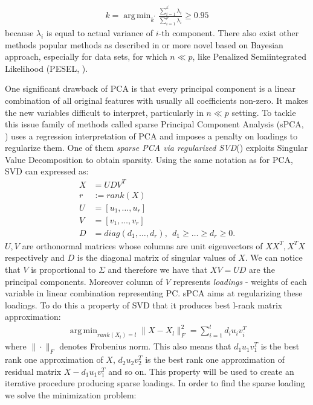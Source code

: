 \documentclass[12pt, wide]{mwart}
\DeclareMathOperator*{\argmin}{arg\,min}
\begin{document}
\begin{align*}
    k = \argmin_{k^{\prime}} \frac{\sum_{i=1}^{k^{\prime}} \lambda_i }{\sum_{i=1}^p \lambda_i} \geq 0.95
\end{align*}
because $\lambda_i$ is equal to actual variance of $i$-th component. There also exist other methods popular methods as described in \cite[chapter 6]{PCA} or more novel based on Bayesian approach, especially for data sets, for which $n \ll p$, like Penalized Semiintegrated Likelihood (PESEL, \cite{pesel}). 

One significant drawback of PCA is that every principal component is a linear combination of all original features with usually all coefficients non-zero. It makes the new variables difficult to interpret, particularly in $n \ll p $ setting. To tackle this issue family of methods called sparse Principal Component Analysis (sPCA, \cite{sPCAold}) uses a regression interpretation of PCA and imposes a penalty on loadings to regularize them. One of them \textit{sparse PCA via regularized SVD}(\cite{SPCAnew}) exploits Singular Value Decomposition to obtain sparsity. Using the same notation as for PCA, SVD can expressed as:
\begin{align*}
    X &= UDV^T \\
    r &:= rank(X) \\
    U &= [u_1, \ldots, u_r] \\
    V &= [v_1, \ldots, v_r] \\
    D &= diag(d_1, \ldots, d_r), \ \ d_1 \geq \ldots \geq d_r \geq 0. 
\end{align*}
$U, V$ are orthonormal matrices whose columns are unit eigenvectors of $XX^T, X^TX$ respectively and $D$ is the diagonal matrix of singular values of $X$. We can notice that $V$ is proportional to $\Sigma$ and therefore we have that $XV = UD$ are the principal components. Moreover column of $V$ represents \textit{loadings} - weights of each variable in linear combination representing PC. sPCA aims at regularizing these loadings. To do this a property of SVD that it produces best l-rank matrix approximation:
\begin{align*}
    \argmin_{rank(X_l) = l}\| X - X_l \|_F^2 = \sum_{i=1}^l d_iu_iv_i^T
\end{align*} where $\| \cdot \|_F$ denotes Frobenius norm. This also means that $d_1u_1v_1^T$ is the best rank one approximation of $X$, $d_2u_2v_2^T$ is the best rank one approximation of residual matrix $X - d_1u_1v_1^T$ and so on. This property will be used to create an iterative procedure producing sparse loadings. In order to find the sparse loading we solve the minimization problem:
\end{document}

